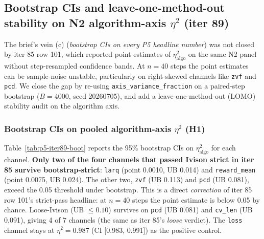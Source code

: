 \subsection{Bootstrap CIs and leave-one-method-out stability on N2 algorithm-axis \texorpdfstring{$\eta^2$}{eta\textasciicircum 2} (iter 89)}
\label{sec:p5-iter89-n2-bootstrap}

The brief's vein (c) (\emph{bootstrap CIs on every P5 headline number})
was not closed by iter 85 row 101, which reported point estimates of
$\eta^2_{\mathrm{algo}}$ on the same N2 panel without step-resampled
confidence bands. At $n{=}40$ steps the point estimates can be
sample-noise unstable, particularly on right-skewed channels like
\texttt{zvf} and \texttt{pcd}. We close the gap by re-using
\texttt{axis\_variance\_fraction} on a paired-step bootstrap
($B{=}4000$, seed 20260705), and add a leave-one-method-out (LOMO)
stability audit on the algorithm axis.

\subsubsection{Bootstrap CIs on pooled algorithm-axis \texorpdfstring{$\eta^2$}{eta\textasciicircum 2} (H1)}
\label{sec:p5-iter89-h1}
Table~\ref{tab:p5-iter89-boot} reports the 95\% bootstrap CIs on
$\eta^2_{\mathrm{algo}}$ for each channel. \textbf{Only two of the
four channels that passed Ivison strict in iter 85 survive
bootstrap-strict}: \texttt{larq} (point 0.0010, UB 0.014) and
\texttt{reward\_mean} (point 0.0075, UB 0.024). The other two,
\texttt{zvf} (UB 0.113) and \texttt{pcd} (UB 0.081), exceed the
0.05 threshold under bootstrap. This is a direct \emph{correction}
of iter 85 row 101's strict-pass headline: at $n{=}40$ steps the
point estimate is below 0.05 by chance. Loose-Ivison (UB
$\leq 0.10$) survives on \texttt{pcd} (UB 0.081) and
\texttt{cv\_len} (UB 0.091), giving 4 of 7 channels (the same as
iter 85's \emph{loose} verdict). The \texttt{loss} channel stays
at $\eta^2{=}0.987$ (CI [0.983, 0.991]) as the positive control.

